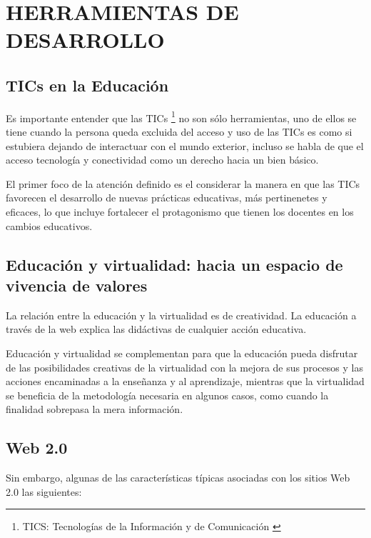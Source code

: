 \chapter{HERRAMIENTAS DE DESARROLLO}

\section{TICs en la Educaci\'{o}n}

Es importante entender que las TICs \footnote{TICS: Tecnolog\'{i}as de la 
Informaci\'{o}n y de Comunicaci\'{o}n \cite{severin2013enfoques}} no son s\'{o}lo herramientas, uno de ellos
se tiene cuando la persona queda excluida del acceso y uso de las TICs es como si
estubiera dejando de interactuar con el mundo exterior, incluso se habla de que 
el acceso tecnolog\'{i}a y conectividad como un derecho hacia un bien b\'{a}sico.

El primer foco de la atenci\'{o}n definido es el considerar la manera en que las TICs
favorecen el desarrollo de nuevas pr\'{a}cticas educativas, m\'{a}s pertinenetes y eficaces,
lo que incluye fortalecer el protagonismo que tienen los docentes en los cambios
educativos.\cite{severin2013enfoques}

\section{Educaci\'{o}n y virtualidad: hacia un espacio de vivencia de valores}

La relaci\'{o}n entre la educaci\'{o}n y la virtualidad es de creatividad. La 
educaci\'{o}n a trav\'{e}s de la web explica las did\'{a}ctivas de cualquier 
acci\'{o}n educativa. 

Educaci\'{o}n y virtualidad se complementan para que la educaci\'{o}n pueda 
disfrutar de las posibilidades creativas de la virtualidad con la mejora de sus
procesos y las acciones encaminadas a la ense\~{n}anza y al aprendizaje, mientras
que la virtualidad se beneficia de la metodolog\'{i}a necesaria en algunos casos,
como cuando la finalidad sobrepasa la mera informaci\'{o}n.
\cite{duart2000aprender}

\section{Web 2.0}

Sin embargo, algunas de las caracter\'{i}sticas t\'{i}picas asociadas con los sitios
Web 2.0 las siguientes:

